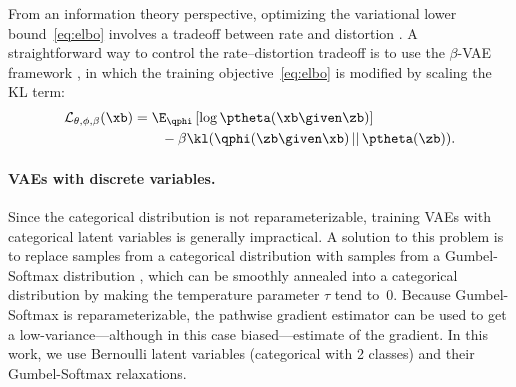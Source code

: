 From an information theory perspective, optimizing the variational lower bound~\eqref{eq:elbo} involves a tradeoff between rate and distortion \cite{alemi2017fixing}.
A straightforward way to control the rate--distortion tradeoff is to use the $\beta$-VAE framework \cite{higgins2017beta}, in which the training objective~\eqref{eq:elbo} is modified by scaling the KL term:
%
\begin{align}
    \mathcal{L}_{\theta,\phi, \beta} (\xb) &= \E_{\qphi}  \left[ \log \ptheta(\xb \given \zb) \right] \label{eq:beta_objective_function}\\
    &\qquad - \beta \kl(\qphi(\zb \given \xb) \,||\, \ptheta(\zb)). \nonumber
\end{align}

\paragraph{VAEs with discrete variables.}
Since the categorical distribution is not reparameterizable, training VAEs with categorical latent variables is generally impractical. A solution to this problem is to replace samples from a categorical distribution with samples from a Gumbel-Softmax distribution \cite{jang2016categorical,maddison2016concrete}, which can be smoothly annealed into a categorical distribution by making the temperature parameter $\tau$ tend to~0. Because Gumbel-Softmax is reparameterizable, the pathwise gradient estimator can be used to get a low-variance---although in this case biased---estimate of the gradient.
In this work, we use Bernoulli latent variables (categorical with 2 classes) and their Gumbel-Softmax relaxations. 
